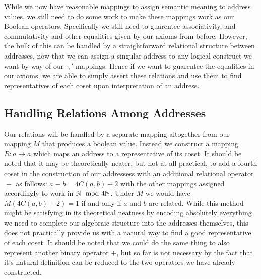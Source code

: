 \documentclass[12pt]{amsart}
\begin{document}
While we now have reasonable mappings to assign semantic meaning to address values, we still need to do some work to make these mappings work as our Boolean operators. Specifically we still need to guarentee associativity, and commutativity and other equalities given by our axioms from before. However, the bulk of this can be handled by a straightforward relational structure between addresses, now that we can assign a singular address to any logical construct we want by way of our $\cdot,'$ mappings. Hence if we want to guarentee the equalities in our axioms, we are able to simply assert these relations and use them to find representatives of each coset upon interpretation of an address.
\subsection{Handling Relations Among Addresses}
Our relations will be handled by a separate mapping altogether from our mapping $M$ that produces a boolean value. Instead we construct a mapping $R:a\rightarrow\bar{a}$ which maps an address to a representative of its coset. It should be noted that it may be theoretically neater, but not at all practical, to add a fourth coset in the construction of our addressess with an additional relational operator $\equiv $ as follows: $a\equiv b = 4C(a,b) + 2$ with the other mappings assigned accordingly to work in $\mathbb{N}\mod 4\mathbb{N}$. Under $M$ we would have $M(4C(a,b) + 2) = 1$ if and only if $a$ and $b$ are related. While this method might be satisfying in its theoretical neatness by encoding absolutely everything we need to complete our algebraic structure into the addresses themselves, this does not practically provide us with a natural way to find a good representative of each coset. It should be noted that we could do the same thing to also represent another binary operator $+$, but so far is not necessary by the fact that it's natural definition can be reduced to the two operators we have already constructed.
\end{document}
